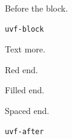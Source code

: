 \documentclass{article}
\begin{document}
Before the block.
\begin{Verbatim}[frame=none]
uvf-block
\end{Verbatim}
Text  more.

Red  end.

Filled  end.

Spaced  end.
\begin{Verbatim}[frame=none]
uvf-after
\end{Verbatim}
\end{document}
